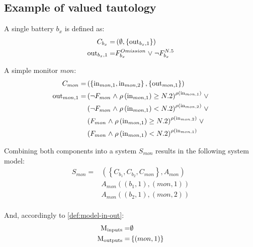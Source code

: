 \subsection{Example of valued tautology}
%
A single battery $b_x$ is defined as:
\begin{align*}
C_{b_x} = & \left( \emptyset, \left\{\mathrm{out}_{b_x,1}\right\} \right) \\
\mathrm{out}_{b_x,1} = & F_{b_x}^{Omission} \mathrel{\vee} \neg F_{b_x}^{N.5}
\end{align*}

A simple monitor $mon$:
\begin{align*}
C_{mon} = &  \left( 
    \left\{\mathrm{in}_{mon,1}, \mathrm{in}_{mon,2}\right\}, 
    \left\{\mathrm{out}_{mon,1}\right\} 
  \right) \\
\mathrm{out}_{mon,1} = 
  &\left( 
    \neg F_{mon} \mathrel{\wedge} \rho\left(\mathrm{in}_{mon,1}\right) \geq N.2
  \right)^{\rho\left(\mathrm{in}_{mon,1}\right)} \mathrel{\vee} \\
  & \left(
    \neg F_{mon} \mathrel{\wedge} \rho\left(\mathrm{in}_{mon,1}\right) < N.2
  \right)^{\rho\left(\mathrm{in}_{mon,2}\right) } \mathrel{\vee} \\
  & \left(
    F_{mon} \mathrel{\wedge} \rho\left(\mathrm{in}_{mon,1}\right) \geq N.2
  \right)^{\rho\left(\mathrm{in}_{mon,2}\right)} \mathrel{\vee} \\
  & \left(
    F_{mon} \mathrel{\wedge} \rho\left(\mathrm{in}_{mon,1}\right) < N.2
  \right)^{\rho\left(\mathrm{in}_{mon,1}\right)}
\end{align*}

Combining both components into a system $S_{mon}$ results in the following system model:
\begin{align*}
S_{mon} = & \left(\left\{ C_{b_1}, C_{b_2}, C_{mon} \right\}, A_{mon} \right) \\
& A_{mon}\left(\left(b_1, 1\right), \left(mon, 1\right) \right) \\
& A_{mon}\left(\left(b_2, 1\right), \left(mon, 2\right) \right) \\
\end{align*}

And, accordingly to \cref{def:model-in-out}:
\begin{align*}
\mathrm{M_{inputs}} =& \emptyset \\
\mathrm{M_{outputs}} =& \left\{ \left(mon, 1\right) \right\}
\end{align*}

